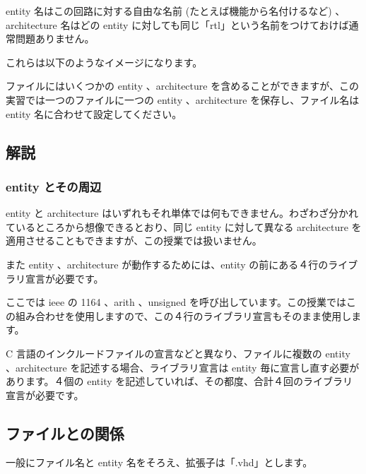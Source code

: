\documentclass[letterpaper,10pt,dvipdfmx]{sphinxmanual}
\begin{document}
entity 名はこの回路に対する自由な名前 (たとえば機能から名付けるなど) 、architecture 名はどの entity に対しても同じ「rtl」という名前をつけておけば通常問題ありません。

これらは以下のようなイメージになります。

\begin{figure}[htbp]
\centering

\noindent{}
\end{figure}

ファイルにはいくつかの entity 、architecture を含めることができますが、この実習では一つのファイルに一つの entity 、architecture を保存し、ファイル名は entity 名に合わせて設定してください。

\begin{figure}[htbp]
\centering

\noindent{}
\end{figure}


\subsection{解説}
\label{\detokenize{04_vhdl:id2}}

\subsubsection{entity とその周辺}
\label{\detokenize{04_vhdl:entity}}
entity と architecture はいずれもそれ単体では何もできません。わざわざ分かれているところから想像できるとおり、同じ entity に対して異なる architecture を適用させることもできますが、この授業では扱いません。

また entity 、architecture が動作するためには、entity の前にある４行のライブラリ宣言が必要です。

ここでは ieee の 1164 、arith 、unsigned を呼び出しています。この授業ではこの組み合わせを使用しますので、この４行のライブラリ宣言もそのまま使用します。

C 言語のインクルードファイルの宣言などと異なり、ファイルに複数の entity 、architecture を記述する場合、ライブラリ宣言は entity 毎に宣言し直す必要があります。４個の entity を記述していれば、その都度、合計４回のライブラリ宣言が必要です。


\subsection{ファイルとの関係}
\label{\detokenize{04_vhdl:id3}}
一般にファイル名と entity 名をそろえ、拡張子は「.vhd」とします。
\end{document}
